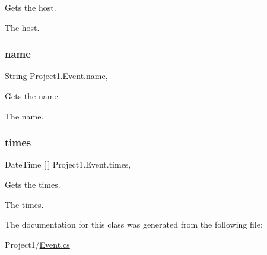 Gets the host. 

The host. \mbox{\label{classProject1_1_1Event_a04f15bb124d4410eece35779864589bf}} 
\subsubsection{\texorpdfstring{name}{name}}
{\footnotesize\ttfamily String Project1.\+Event.\+name\hspace{0.3cm}{\ttfamily [get]}, {}}



Gets the name. 

The name. \mbox{\label{classProject1_1_1Event_acc6d286c687a5ac9256a146d99de1cb6}} 
\subsubsection{\texorpdfstring{times}{times}}
{\footnotesize\ttfamily Date\+Time \mbox{[}$\,$\mbox{]} Project1.\+Event.\+times\hspace{0.3cm}{\ttfamily [get]}, {}}



Gets the times. 

The times. 

The documentation for this class was generated from the following file\+:\begin{DoxyCompactItemize}
\item 
Project1/\hyperlink{Event_8cs}{Event.\+cs}\end{DoxyCompactItemize}
